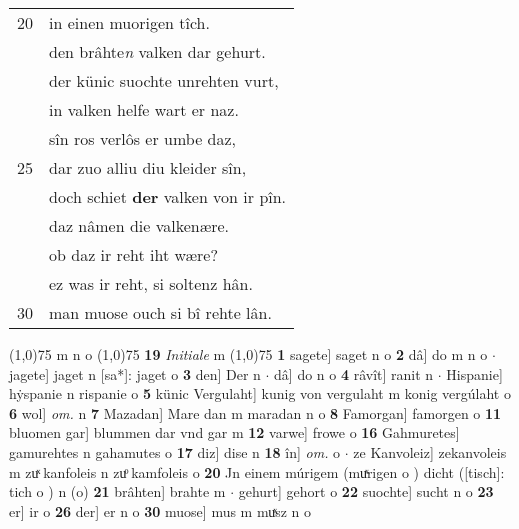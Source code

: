 \documentclass[8pt,a4paper,notitlepage]{article}
\begin{document}
\begin{table}[ht]
\begin{minipage}[t]{0.5\linewidth}
\begin{tabular}{rl}
20 & in einen muorigen tîch.\\ 
 & den brâhte\textit{n} valken dar gehurt.\\ 
 & der künic suochte unrehten vurt,\\ 
 & in valken helfe wart er naz.\\ 
 & sîn ros verlôs er umbe daz,\\ 
25 & dar zuo alliu diu kleider sîn,\\ 
 & doch schiet \textbf{der} valken von ir pîn.\\ 
 & daz nâmen die valkenære.\\ 
 & ob daz ir reht iht wære?\\ 
 & ez was ir reht, si soltenz hân.\\ 
30 & man muose ouch si bî rehte lân.\\ 
\end{tabular}
\scriptsize
\line(1,0){75} \newline
m n o \newline
\line(1,0){75} \newline
\textbf{19} \textit{Initiale} m  \newline
\line(1,0){75} \newline
\textbf{1} sagete] saget n o \textbf{2} dâ] do m n o  $\cdot$ jagete] jaget n [sa*]: jaget o \textbf{3} den] Der n  $\cdot$ dâ] do n o \textbf{4} râvît] ranit n  $\cdot$ Hispanie] hẏspanie n rispanie o \textbf{5} künic Vergulaht] kunig von vergulaht m konig vergúlaht o \textbf{6} wol] \textit{om.} n \textbf{7} Mazadan] Mare dan m maradan n o \textbf{8} Famorgan] famorgen o \textbf{11} bluomen gar] blummen dar vnd gar m \textbf{12} varwe] frowe o \textbf{16} Gahmuretes] gamurehtes n gahamutes o \textbf{17} diz] dise n \textbf{18} în] \textit{om.} o  $\cdot$ ze Kanvoleiz] zekanvoleis m zuͯ kanfoleis n zuͦ kamfoleis o \textbf{20} Jn einem múrigem (muͯrigen o ) dicht ([tisch]: tich o ) n (o) \textbf{21} brâhten] brahte m  $\cdot$ gehurt] gehort o \textbf{22} suochte] sucht n o \textbf{23} er] ir o \textbf{26} der] er n o \textbf{30} muose] mus m muͯsz n o \newline
\end{minipage}
\end{table}
\newpage
\end{document}
